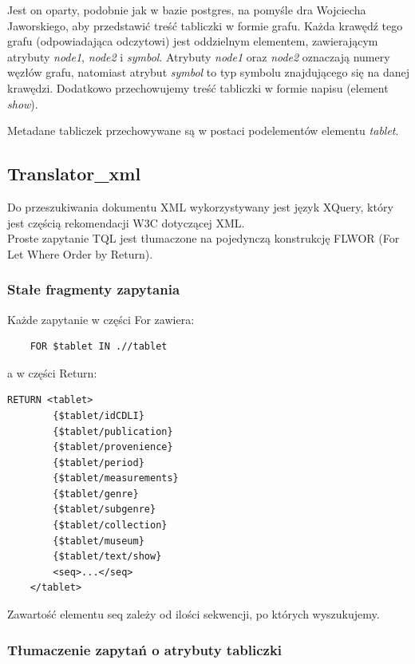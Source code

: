 Jest on oparty, podobnie jak w bazie postgres, na pomyśle dra Wojciecha Jaworskiego, 
 aby przedstawić treść tabliczki w formie grafu. 
Każda krawędź tego grafu (odpowiadająca odczytowi) jest oddzielnym elementem, zawierającym atrybuty \textit{node1}, \textit{node2} 
i \textit{symbol}.
Atrybuty \textit{node1} oraz \textit{node2} oznaczają numery węzłów grafu,
natomiast atrybut \textit{symbol} to typ symbolu znajdującego się na danej krawędzi. 
Dodatkowo przechowujemy treść tabliczki w formie napisu (element \textit{show}). 

Metadane tabliczek przechowywane są w postaci podelementów elementu \textit{tablet}.


\subsection{Translator\_xml}
Do przeszukiwania dokumentu XML wykorzystywany jest język XQuery, który jest częścią rekomendacji W3C dotyczącej XML.\\
Proste zapytanie TQL jest tłumaczone na pojedynczą konstrukcję FLWOR (For Let Where Order by Return).\\

\subsubsection{Stałe fragmenty zapytania}
Każde zapytanie w części For zawiera:
	\begin{verbatim}
	FOR $tablet IN .//tablet
\end{verbatim}
a w części Return:
  \begin{verbatim}RETURN <tablet>
		{$tablet/idCDLI}
		{$tablet/publication}
		{$tablet/provenience}
		{$tablet/period}
		{$tablet/measurements}
		{$tablet/genre}
		{$tablet/subgenre}
		{$tablet/collection}
		{$tablet/museum}
		{$tablet/text/show}
		<seq>...</seq>
	</tablet>
\end{verbatim}
Zawartość elementu seq zależy od ilości sekwencji, po których wyszukujemy. 

\subsubsection{Tłumaczenie zapytań o atrybuty tabliczki}

